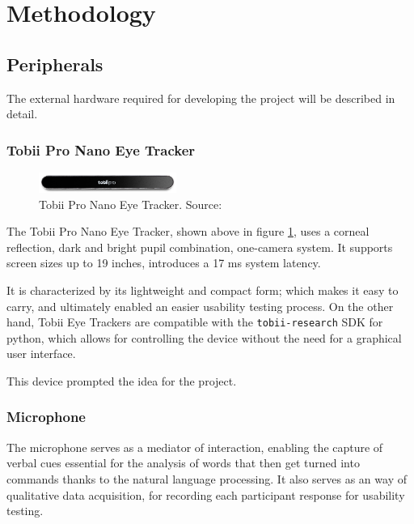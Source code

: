 \section{Methodology}


\subsection{Peripherals}

The external hardware required for developing the project will be described in detail.

\subsubsection{Tobii Pro Nano Eye Tracker}

\begin{figure}[ht]
    \centering
    \includegraphics[width=0.4\textwidth]{images/tobii-pro-nano.png}
    \caption{Tobii Pro Nano Eye Tracker. Source: \citep{manual:tobiipronano}}
    \label{fig:tobii-eye-tracker}
\end{figure}

The Tobii Pro Nano Eye Tracker, shown above in figure \ref{fig:tobii-eye-tracker}, uses a corneal reflection, dark and bright pupil combination, one-camera system. It supports screen sizes up to 19 inches, introduces a 17 ms system latency. \citep{manual:tobiipronano}

It is characterized by its lightweight and compact form; which makes it easy to carry, and ultimately enabled an easier usability testing process. On the other hand, Tobii Eye Trackers are compatible with the \verb|tobii-research| SDK for python, which allows for controlling the device without the need for a graphical user interface.

This device prompted the idea for the project.

\subsubsection{Microphone}

The microphone serves as a mediator of interaction, enabling the capture of verbal cues essential for the analysis of words that then get turned into commands thanks to the natural language processing. It also serves as an way of qualitative data acquisition, for recording each participant response for usability testing.

